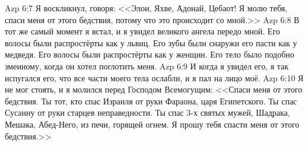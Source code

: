 \vs Azp 6:7
Я воскликнул, говоря:
<<Элои, Яхве, Адонай, Цебаот!
Я молю тебя, спаси меня от этого бедствия,
потому что это происходит со мной.>>
\vs Azp 6:8
В тот же самый момент я встал,
и я увидел великого ангела передо мной.
Его волосы были распростёрты как у львиц.
Его зубы были снаружи его пасти как у медведя.
Его волосы были распростёрты как у женщин.
Его тело было подобно змеиному,
когда он хотел поглотить меня.
\vs Azp 6:9
И когда я увидел его, я так испугался его,
что все части моего тела ослабли, и я пал на лицо моё.
\vs Azp 6:10
Я не мог стоять, и я молился перед Господом Всемогущим:
<<Спаси меня от этого бедствия.
Ты тот, кто спас Израиля от руки Фараона, царя Египетского.
Ты спас Сусанну от руки старцев неправедности.
Ты спас 3-х святых мужей, Шадрака, Мешака, Абед-Него,
из печи, горящей огнем.
Я прошу тебя спасти меня от этого бедствия.>>

